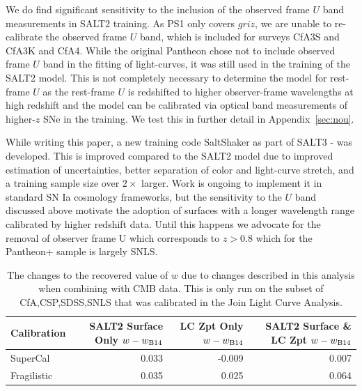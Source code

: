 \documentclass[twocolumn]{aastex63}
\newcommand{\blue}{\color{black}}
\begin{document}
We do find significant sensitivity to the inclusion of the observed frame $U$ band measurements in SALT2 training. As PS1 only covers $griz$, we are unable to re-calibrate the observed frame $U$ band, which is included for surveys CfA3S and CfA3K and CfA4.  While the original Pantheon chose not to include observed frame $U$ band in the fitting of light-curves, it was still used in the training of the SALT2 model.  This is not completely necessary to determine the model for rest-frame $U$ {\blue as the rest-frame $U$ is redshifted to higher observer-frame wavelengths at high redshift and the model can be calibrated via optical band measurements of higher-$z$ SNe in the training. We test this in further detail in Appendix~\ref{sec:nou}.}

While writing this paper, a new training code SaltShaker as part of SALT3 - \cite{Kenworthy21} was developed.  This is improved compared to the SALT2 model due to improved estimation of uncertainties, better separation of color and light-curve stretch, and a training sample size over $2\times$ larger.  Work is ongoing to implement it in standard SN Ia cosmology frameworks, but the sensitivity to the $U$ band discussed above motivate the adoption of surfaces with a longer wavelength range calibrated by higher redshift data. Until this happens we advocate for the removal of observer frame U which corresponds to $z>0.8$ which for the Pantheon+ sample is largely SNLS.

\begin{table}
\centering
\begin{tabular}{lrrr}
\toprule
    Calibration & SALT2 Surface Only $w-w_{\rm B14}$ & LC Zpt Only $w-w_{\rm B14 }$& SALT2 Surface \& LC Zpt $w-w_{\rm B14}$ \\
\hline
      SuperCal &  0.033 & -0.009 & 0.007 \\
      Fragilistic &  0.035 & 0.025  & 0.064 \\
\end{tabular}
\caption{The changes to the recovered value of $w$ due to changes described in this analysis when combining with CMB data. This is only run on the subset of CfA,CSP,SDSS,SNLS that was calibrated in the Join Light Curve Analysis.}
\label{tab:cosmoresults}
\end{table}
\end{document}

